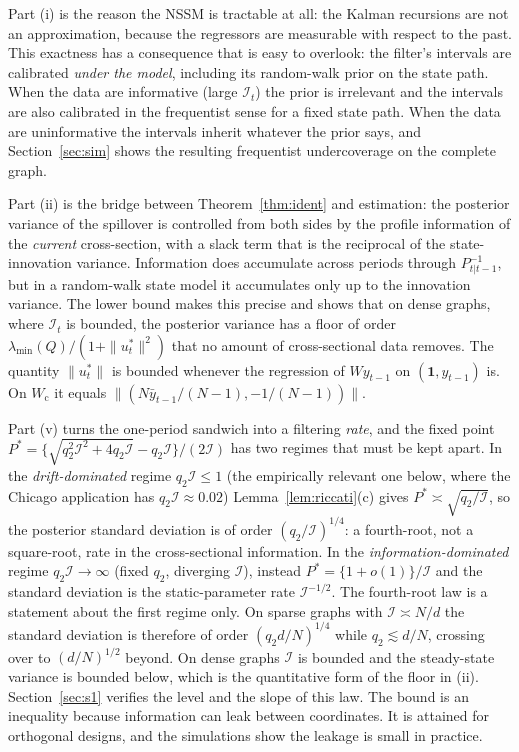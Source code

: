 \documentclass[12pt]{article}
\theoremstyle{plain}
\theoremstyle{definition}
\theoremstyle{remark}
\newcommand{\one}{\mathbf{1}}
\newcommand{\calI}{\mathcal{I}}
\newcommand{\Wc}{W_{\mathrm{c}}}
\begin{document}
Part (i) is the reason the NSSM is tractable at all: the Kalman recursions are not an approximation, because the regressors are measurable with respect to the past. This exactness has a consequence that is easy to overlook: the filter's intervals are calibrated \emph{under the model}, including its random-walk prior on the state path. When the data are informative (large $\calI_t$) the prior is irrelevant and the intervals are also calibrated in the frequentist sense for a fixed state path. When the data are uninformative the intervals inherit whatever the prior says, and Section~\ref{sec:sim} shows the resulting frequentist undercoverage on the complete graph.

Part (ii) is the bridge between Theorem~\ref{thm:ident} and estimation: the posterior variance of the spillover is controlled from both sides by the profile information of the \emph{current} cross-section, with a slack term that is the reciprocal of the state-innovation variance. Information does accumulate across periods through $P_{t|t-1}^{-1}$, but in a random-walk state model it accumulates only up to the innovation variance. The lower bound makes this precise and shows that on dense graphs, where $\calI_t$ is bounded, the posterior variance has a floor of order $\lambda_{\min}(Q)/(1+\|u^*_t\|^2)$ that no amount of cross-sectional data removes. The quantity $\|u_t^*\|$ is bounded whenever the regression of $Wy_{t-1}$ on $(\one,y_{t-1})$ is. On $\Wc$ it equals $\|(N\bar y_{t-1}/(N-1),-1/(N-1))\|$.

Part (v) turns the one-period sandwich into a filtering \emph{rate}, and the fixed point $P^\ast=\{\sqrt{q_2^2\calI^2+4q_2\calI}-q_2\calI\}/(2\calI)$ has two regimes that must be kept apart. In the \emph{drift-dominated} regime $q_2\calI\le1$ (the empirically relevant one below, where the Chicago application has $q_2\calI\approx0.02$) Lemma~\ref{lem:riccati}(c) gives $P^\ast\asymp\sqrt{q_2/\calI}$, so the posterior standard deviation is of order $(q_2/\calI)^{1/4}$: a fourth-root, not a square-root, rate in the cross-sectional information. In the \emph{information-dominated} regime $q_2\calI\to\infty$ (fixed $q_2$, diverging $\calI$), instead $P^\ast=\{1+o(1)\}/\calI$ and the standard deviation is the static-parameter rate $\calI^{-1/2}$. The fourth-root law is a statement about the first regime only. On sparse graphs with $\calI\asymp N/d$ the standard deviation is therefore of order $(q_2d/N)^{1/4}$ while $q_2\lesssim d/N$, crossing over to $(d/N)^{1/2}$ beyond. On dense graphs $\calI$ is bounded and the steady-state variance is bounded below, which is the quantitative form of the floor in (ii). Section~\ref{sec:s1} verifies the level and the slope of this law. The bound is an inequality because information can leak between coordinates. It is attained for orthogonal designs, and the simulations show the leakage is small in practice.
\end{document}
